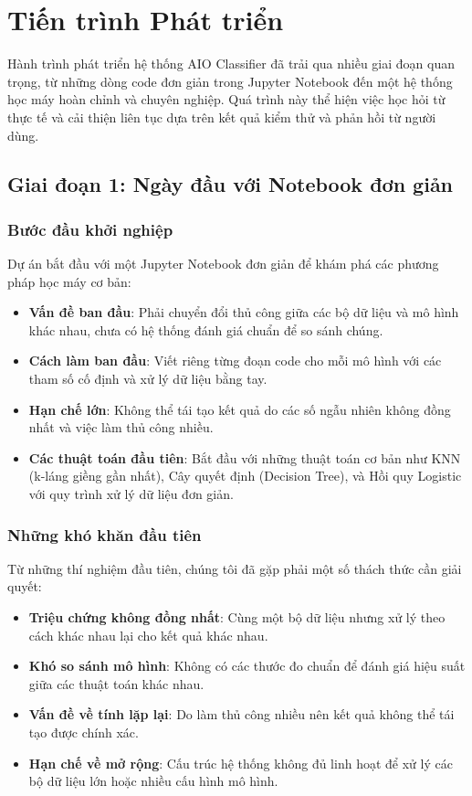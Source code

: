 \section{Tiến trình Phát triển}\label{sec:project-evolution}

\noindent
Hành trình phát triển hệ thống AIO Classifier đã trải qua nhiều giai đoạn quan trọng, từ những dòng code đơn giản trong Jupyter Notebook đến một hệ thống học máy hoàn chỉnh và chuyên nghiệp. Quá trình này thể hiện việc học hỏi từ thực tế và cải thiện liên tục dựa trên kết quả kiểm thử và phản hồi từ người dùng.

\subsection{Giai đoạn 1: Ngày đầu với Notebook đơn giản}\label{subsec:prototype-stage}

\subsubsection{Bước đầu khởi nghiệp}

Dự án bắt đầu với một Jupyter Notebook đơn giản để khám phá các phương pháp học máy cơ bản:

\begin{itemize}
    \item \textbf{Vấn đề ban đầu}: Phải chuyển đổi thủ công giữa các bộ dữ liệu và mô hình khác nhau, chưa có hệ thống đánh giá chuẩn để so sánh chúng.
    \item \textbf{Cách làm ban đầu}: Viết riêng từng đoạn code cho mỗi mô hình với các tham số cố định và xử lý dữ liệu bằng tay.
    \item \textbf{Hạn chế lớn}: Không thể tái tạo kết quả do các số ngẫu nhiên không đồng nhất và việc làm thủ công nhiều.
    \item \textbf{Các thuật toán đầu tiên}: Bắt đầu với những thuật toán cơ bản như KNN (k-láng giềng gần nhất), Cây quyết định (Decision Tree), và Hồi quy Logistic với quy trình xử lý dữ liệu đơn giản.
\end{itemize}

\subsubsection{Những khó khăn đầu tiên}

Từ những thí nghiệm đầu tiên, chúng tôi đã gặp phải một số thách thức cần giải quyết:

\begin{itemize}
    \item \textbf{Triệu chứng không đồng nhất}: Cùng một bộ dữ liệu nhưng xử lý theo cách khác nhau lại cho kết quả khác nhau.
    \item \textbf{Khó so sánh mô hình}: Không có các thước đo chuẩn để đánh giá hiệu suất giữa các thuật toán khác nhau.
    \item \textbf{Vấn đề về tính lặp lại}: Do làm thủ công nhiều nên kết quả không thể tái tạo được chính xác.
    \item \textbf{Hạn chế về mở rộng}: Cấu trúc hệ thống không đủ linh hoạt để xử lý các bộ dữ liệu lớn hoặc nhiều cấu hình mô hình.
\end{itemize}

